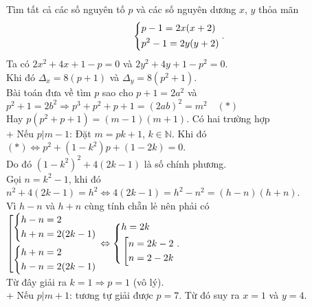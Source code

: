\begin{ex}%
Tìm tất cả các số nguyên tố $p$ và các số nguyên dương $x$, $y$ thỏa mãn $$\left\{\begin{aligned}&p-1 = 	2x(x+2) \\ &p^2 - 1 = 2y(y+2)\end{aligned}\right..$$
\loigiai
	{
		Ta có $2x^2+4x+1-p=0$ và $2y^2+4y+1-p^2 = 0$.\\
        Khi đó $\Delta_x = 8(p+1)$ và $\Delta_y = 8(p^2+1)$.\\
        Bài toán đưa về tìm $p$ sao cho $p+1 = 2a^2$ và $p^2+1 = 2b^2 \Rightarrow p^3+p^2+p+1 = (2ab)^2 = m^2\quad(*)$\\
        Hay $p(p^2+p+1) = (m-1)(m+1)$. Có hai trường hợp\\
        + Nếu $p|m-1$: Đặt $m = pk+1$, $k \in \mathbb N$. Khi đó $(*) \Leftrightarrow p^2 +(1-k^2)p+(1-2k)=0$.\\
        Do đó $(1-k^2)^2+4(2k-1)$ là số chính phương.\\
        Gọi $n=k^2-1$, khi đó $n^2+4(2k-1) = h^2 \Leftrightarrow 4(2k-1) = h^2 - n^2 = (h-n)(h+n)$.\\
        Vì $h-n$ và $h+n$ cùng tính chẵn lẻ nên phải có $\left[\begin{aligned}\left\{\begin{aligned}&h-n = 2 \\ &h+n = 2(2k-1)\end{aligned}\right.\\\left\{\begin{aligned}&h+n = 2 \\ &h-n = 2(2k-1)\end{aligned}\right.\end{aligned}\right. \Leftrightarrow \left\{\begin{aligned}&h= 2k \\ &\left[\begin{aligned}n = 2k-2\\n = 2-2k\end{aligned}\right.\end{aligned}\right.$.\\
        Từ đây giải ra $k=1\Rightarrow p=1$ (vô lý).\\
        + Nếu $p|m+1$: tương tự giải được $p=7$. Từ đó suy ra $x=1$ và $y=4$.
	}
\end{ex}

